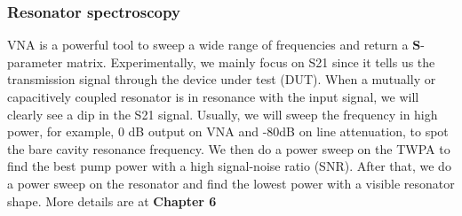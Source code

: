 \subsubsection{Resonator spectroscopy}
VNA is a powerful tool to sweep a wide range of frequencies and return a $\mathbf{S}$-parameter matrix. Experimentally, we mainly focus on S21 since it tells us the transmission signal through the device under test (DUT). When a mutually or capacitively coupled resonator is in resonance with the input signal, we will clearly see a dip in the S21 signal. Usually, we will sweep the frequency in high power, for example, 0 dB output on VNA and -80dB on line attenuation, to spot the bare cavity resonance frequency. We then do a power sweep on the TWPA to find the best pump power with a high signal-noise ratio (SNR). After that, we do a power sweep on the resonator and find the lowest power with a visible resonator shape. More details are at \textbf{Chapter 6} 



